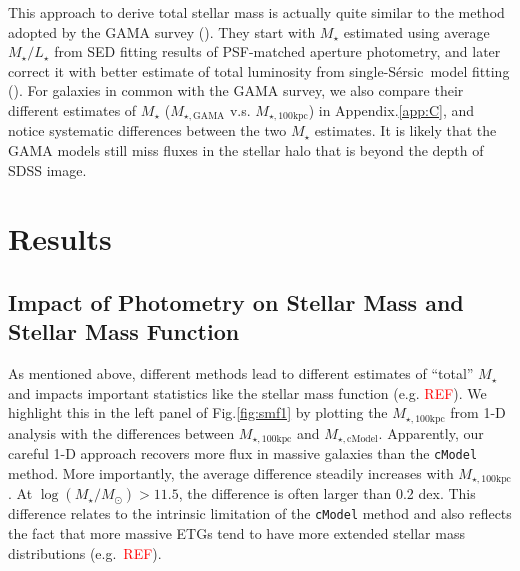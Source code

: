 \documentclass{emulateapj}
\def\ser{{S\'{e}rsic\ }}
\def\mstar{{$M_{\star}$}}
\def\logms{{$\log (M_{\star}/M_{\odot})$}}
\def\mtot{{$M_{\star,100\mathrm{kpc}}$}}
\def\mgama{{$M_{\star,\mathrm{GAMA}}$}}
\def\mcmodel{{$M_{\star,\mathrm{cModel}}$}}
\def\m2l{{$M_{\star}/L_{\star}$}}
\newcommand{\addref}{{\textcolor{red}{REF}}}
\begin{document}
\begin{CJK*}{UTF8}{gbsn}
    This approach to derive total stellar mass is actually quite similar to the 
    method adopted by the GAMA survey (\citealt{Taylor2011}).
    They start with \mstar{} estimated using average \m2l{} from SED fitting 
    results of PSF-matched aperture photometry, and later correct it with better 
    estimate of total luminosity from single-\ser model fitting
    (\citealt{Kelvin2012}). 
    For galaxies in common with the GAMA survey, we also compare their different 
    estimates of \mstar{} (\mgama{} v.s. \mtot{}) in Appendix.\ref{app:C},  
    and notice systematic differences between the two \mstar{} estimates.
    It is likely that the GAMA models still miss fluxes in the stellar halo that 
    is beyond the depth of SDSS image. 

\section{Results}
    \label{sec:result} 
    
    \subsection{Impact of Photometry on Stellar Mass and Stellar Mass Function}
    \label{ssec:s82}
    
    As mentioned above, different methods lead to different estimates of ``total'' 
    \mstar{} and impacts important statistics like the stellar mass function 
    (e.g. \addref{}).
    We highlight this in the left panel of Fig.\ref{fig:smf1} by plotting 
    the \mtot{} from 1-D analysis with the differences between \mtot{} and \mcmodel{}.
    Apparently, our careful 1-D approach recovers more flux in massive galaxies 
    than the \texttt{cModel} method. 
    More importantly, the average difference steadily increases with \mtot{}. 
    At \logms$>11.5$, the difference is often larger than 0.2 dex.  
    This difference relates to the intrinsic limitation of the \texttt{cModel} 
    method and also reflects the fact that more massive ETGs tend to have more 
    extended stellar mass distributions (e.g.\ \addref{}). 
     

\end{CJK*}
\end{document}
